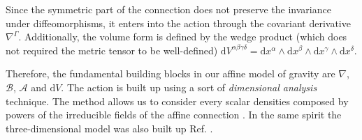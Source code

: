\documentclass{article}
\providecommand{\deV}[1]{\mathrm{d}V^{#1}}
\begin{document}
Since the symmetric part of the connection does not preserve the invariance under diffeomorphisms, it enters into 
the action through the covariant derivative $\nabla^{\Gamma}$. Additionally, the volume form is defined by the wedge product (which does not
required the metric tensor to be well-defined) $\deV{\alpha\beta\gamma\delta} = \mathrm{d}x^{\alpha}\wedge\mathrm{d}x^{\beta}\wedge
\mathrm{d}x^{\gamma}\wedge\mathrm{d}x^{\delta}$.

Therefore, the fundamental building blocks in our affine model of gravity are $\nabla$, $\mathcal{B}$, $\mathcal{A}$ and $\mathrm{d}V$. The action is built up using
a sort of \textit{dimensional analysis} technique. The method allows us to consider every scalar densities composed by powers
of the irreducible fields of the affine connection \cite{castillofelisola2016einsteins,Castillo_Felisola_2020}. In the same spirit the three-dimensional model was also built up Ref. \cite{Castillo_Felisola_2022_EPJC}.
\end{document}
